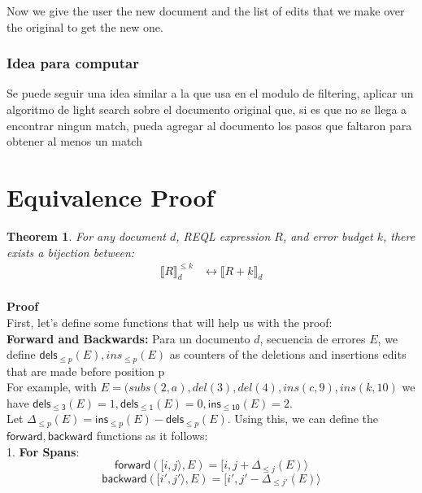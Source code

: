 \documentclass{article}
\newtheorem{theorem}{Theorem}
\begin{document}
Now we give the user the new document and the list of edits that we make over the original to get the new one.

\subsubsection{Idea para computar}

Se puede seguir una idea similar a la que usa en el modulo de filtering, aplicar un algoritmo de light search sobre el documento original que, si es que no se llega a encontrar ningun match, pueda agregar al documento los pasos que faltaron para obtener al menos un match 

\section{Equivalence Proof}
\label{sec:equivalence}

\begin{theorem}
For any document $d$, REQL expression $R$, and error budget $k$, there exists a bijection between:
\begin{align*}
\llbracket R \rrbracket^{\leq k}_d &\leftrightarrow \llbracket R + k \rrbracket_d \\
\end{align*}

\end{theorem}

\textbf{Proof}\\

First, let's define some functions that will help us with the proof:\\

\textbf{Forward and Backwards:} Para un documento $d$, secuencia de errores $E$, we define $\mathsf{dels}_{\leq p}(E), ins_{\leq p}(E)$ as counters of the deletions and insertions edits that are made before position p \\

For example, with $ E = (subs(2, a), del(3), del(4), ins(c, 9) , ins (k ,10)$ we have $\mathsf{dels_{\leq 3}} (E) = 1, \mathsf{dels_{\leq 1}} (E)  = 0, \mathsf{ins_{\leq 10}} (E) = 2$. \\

Let $\Delta_{\leq p} (E) = \mathsf{ins}_{\leq p}(E) - \mathsf{dels}_{\leq p} (E)$. Using this, we can define the $\mathsf{forward}, \mathsf{backward}$ functions as it follows: \\

1. \textbf{For Spans}:
\[
\mathsf{forward}([i,j\rangle, E) = [i, j + \Delta_{\leq j}(E)\rangle
\]
\[
\mathsf{backward}([i',j'\rangle, E) = [i', j' - \Delta_{\leq j'}(E)\rangle
\]
\end{document}
